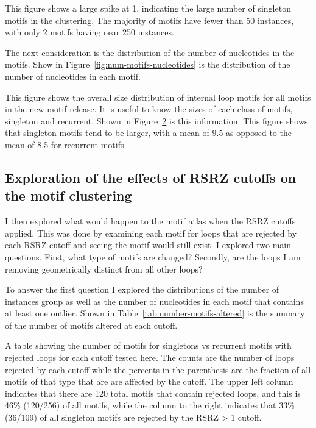 This figure shows a large spike at 1, indicating the large number of singleton
motifs in the clustering. The majority of motifs have fewer than 50 instances,
with only 2 motifs having near 250 instances. 

The next consideration is the distribution of the number of nucleotides in the
motifs. Show in Figure~\ref{fig:num-motifs-nucleotides} is the distribution of
the number of nucleotides in each motif. 

\begin{figure}
  \caption{}
  \label{fig:num-motif-nucleotides}
\end{figure}

This figure shows the overall size distribution of internal loop motifs for all
motifs in the new motif release. It is useful to know the sizes of each class of
motifs, singleton and recurrent. Shown in Figure~\ref{fig:num-nt-by-class} is this
information. This figure shows that singleton motifs tend to be larger, with a
mean of 9.5 as opposed to the mean of 8.5 for recurrent motifs. 

\begin{figure}
  \caption{}
  \label{fig:num-nt-by-class}
\end{figure}

\subsection{Exploration of the effects of RSRZ cutoffs on the motif clustering}

I then explored what would happen to the motif atlas when the RSRZ cutoffs
applied. This was done by examining each motif for loops that are rejected by
each RSRZ cutoff and seeing the motif would still exist. I explored two main
questions. First, what type of motifs are changed? Secondly, are the loops I am
removing geometrically distinct from all other loops? 

To answer the first question I explored the distributions of the number of
instances group as well as the number of nucleotides in each motif  that
contains at least one outlier. Shown in Table~\ref{tab:number-motifs-altered} is
the summary of the number of motifs altered at each cutoff. 

\begin{table}
  \caption{A table showing the number of motifs for singletons vs recurrent
    motifs with rejected loops for each cutoff tested here. The counts are the
    number of loops rejected by each cutoff while the percents in the
    parenthesis are the fraction of all motifs of that type that are are
    affected by the cutoff. The upper left column indicates that there are 120
    total motifs that contain rejected loops, and this is 46\% (120/256) of all
    motifs, while the column to the right indicates that 33\% (36/109) of all
  singleton motifs are rejected by the RSRZ > 1 cutoff.}
  \label{tab:number-motifs-altered}
\end{table}

